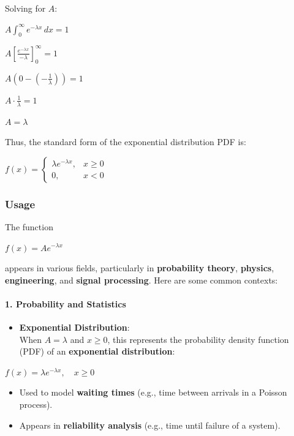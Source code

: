 \documentclass[11pt]{article}
\providecommand{\tightlist}{%
      \setlength{\itemsep}{0pt}\setlength{\parskip}{0pt}}
\begin{document}
Solving for \(A\):

\(A \int_0^\infty e^{-\lambda x} \, dx = 1\)

\(A \left[ \frac{e^{-\lambda x}}{-\lambda} \right]_0^\infty = 1\)

\(A \left( 0 - \left(-\frac{1}{\lambda}\right) \right) = 1\)

\(A \cdot \frac{1}{\lambda} = 1\)

\(A = \lambda\)

Thus, the standard form of the exponential distribution PDF is:

\(f(x) = \begin{cases} \lambda e^{-\lambda x}, & x \geq 0 \\ 0, & x < 0 \end{cases}\)

\subsubsection{Usage}\label{usage}

The function

\(f(x) = A e^{-\lambda x}\)

appears in various fields, particularly in \textbf{probability theory},
\textbf{physics}, \textbf{engineering}, and \textbf{signal processing}.
Here are some common contexts:

\paragraph{\texorpdfstring{\textbf{1. Probability and
Statistics}}{1. Probability and Statistics}}\label{probability-and-statistics}

\begin{itemize}
\tightlist
\item
  \textbf{Exponential Distribution}:\\
  When \(A = \lambda\) and \(x \geq 0\), this represents the probability
  density function (PDF) of an \textbf{exponential distribution}:
\end{itemize}

\(f(x) = \lambda e^{-\lambda x}, \quad x \geq 0\)

\begin{itemize}
\tightlist
\item
  Used to model \textbf{waiting times} (e.g., time between arrivals in a
  Poisson process).
\item
  Appears in \textbf{reliability analysis} (e.g., time until failure of
  a system).
\end{itemize}
\end{document}

